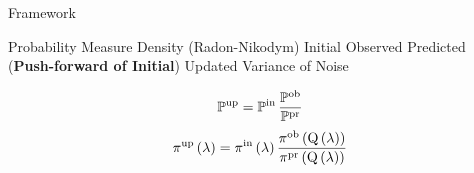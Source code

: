 \begin{block}{Framework}
\large
    \begin{itemize}
        \itembox{$ \PP $} Probability Measure
        \itembox{$ \pi $} Density (Radon-Nikodym)
        \itembox{$ \initialP, \; \initial $} Initial
        \itembox{$ \observedP, \; \observed $} Observed
        \itembox{$ \predictedP, \; \predicted $} Predicted ({\bf Push-forward of Initial})
        \itembox{$ \updatedP, \; \updated $} Updated
        \itembox{$ \sigma $} Variance of Noise
    \end{itemize}

\Large
    \begin{equation*}
            \dciP 
    \end{equation*}
    \begin{equation*}
            \dci
    \end{equation*}

\end{block}
\vspace{-1cm}
